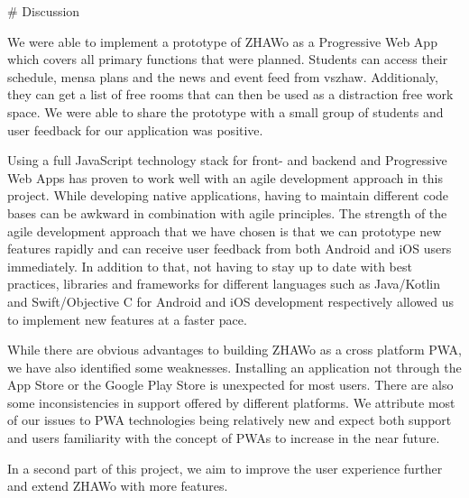 \begin{markdown}

# Discussion

We were able to implement a prototype of ZHAWo as a Progressive Web App which covers all primary functions that were planned. Students can access their schedule, mensa plans and the news and event feed from vszhaw. Additionaly, they can get a list of free rooms that can then be used as a distraction free work space. We were able to share the prototype with a small group of students and user feedback for our application was positive.

Using a full JavaScript technology stack for front- and backend and Progressive Web Apps has proven to work well with an agile development approach in this project. While developing native applications, having to maintain different code bases can be awkward in combination with agile principles. The strength of the agile development approach that we have chosen is that we can prototype new features rapidly and can receive user feedback from both Android and iOS users immediately. In addition to that, not having to stay up to date with best practices, libraries and frameworks for different languages such as Java/Kotlin and Swift/Objective C for Android and iOS development respectively allowed us to implement new features at a faster pace. 

While there are obvious advantages to building ZHAWo as a cross platform PWA, we have also identified some weaknesses. Installing an application not through the App Store or the Google Play Store is unexpected for most users. There are also some inconsistencies in support offered by different platforms. We attribute most of our issues to PWA technologies being relatively new and expect both support and users familiarity with the concept of PWAs to increase in the near future.

In a second part of this project, we aim to improve the user experience further and extend ZHAWo with more features.

\end{markdown}
